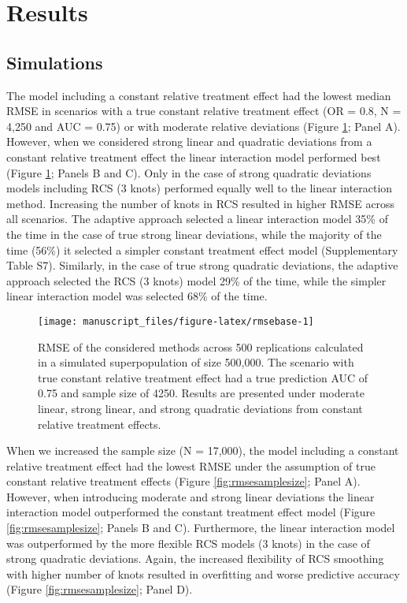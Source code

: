 \documentclass{article}
\begin{document}
\hypertarget{results}{%
\section{Results}\label{results}}

\hypertarget{simulations}{%
\subsection{Simulations}\label{simulations}}

The model including a constant relative treatment effect had the lowest
median RMSE in scenarios with a true constant relative treatment effect
(OR = 0.8, N = 4,250 and AUC = 0.75) or with moderate relative
deviations (Figure \ref{fig:rmsebase}; Panel A). However, when we
considered strong linear and quadratic deviations from a constant
relative treatment effect the linear interaction model performed best
(Figure \ref{fig:rmsebase}; Panels B and C). Only in the case of strong
quadratic deviations models including RCS (3 knots) performed equally
well to the linear interaction method. Increasing the number of knots in
RCS resulted in higher RMSE across all scenarios. The adaptive approach
selected a linear interaction model 35\% of the time in the case of true
strong linear deviations, while the majority of the time (56\%) it
selected a simpler constant treatment effect model (Supplementary Table
S7). Similarly, in the case of true strong quadratic deviations, the
adaptive approach selected the RCS (3 knots) model 29\% of the time,
while the simpler linear interaction model was selected 68\% of the
time.

\begin{figure}
\texttt{[image: manuscript\_files/figure-latex/rmsebase-1]} \caption{RMSE of the considered methods across 500 replications calculated in a simulated superpopulation of size 500,000. The scenario with true constant relative treatment effect had a true prediction AUC of 0.75 and sample size of 4250. Results are presented under moderate linear, strong linear, and strong quadratic deviations from constant relative treatment effects.}\label{fig:rmsebase}
\end{figure}

When we increased the sample size (N = 17,000), the model including a
constant relative treatment effect had the lowest RMSE under the
assumption of true constant relative treatment effects (Figure
\ref{fig:rmsesamplesize}; Panel A). However, when introducing moderate
and strong linear deviations the linear interaction model outperformed
the constant treatment effect model (Figure \ref{fig:rmsesamplesize};
Panels B and C). Furthermore, the linear interaction model was
outperformed by the more flexible RCS models (3 knots) in the case of
strong quadratic deviations. Again, the increased flexibility of RCS
smoothing with higher number of knots resulted in overfitting and worse
predictive accuracy (Figure \ref{fig:rmsesamplesize}; Panel D).
\end{document}
